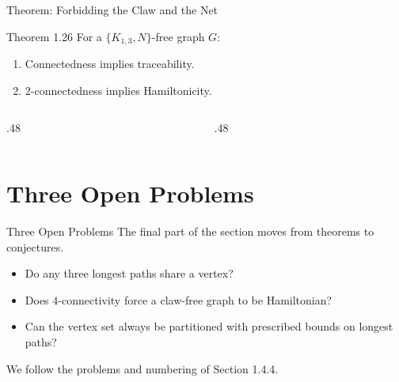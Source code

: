 \documentclass[aspectratio=169,11pt]{beamer}
\begin{document}
\begin{frame}{Theorem: Forbidding the Claw and the Net}
\large
\begin{block}{Theorem 1.26}
For a $\{K_{1,3},N\}$-free graph $G$:\begin{enumerate}\item Connectedness implies traceability.\item $2$-connectedness implies Hamiltonicity.\end{enumerate}
\end{block}
\begin{columns}[c,onlytextwidth]\begin{column}{.48\textwidth}\begin{center}\end{center}\end{column}\begin{column}{.48\textwidth}\begin{center}\end{center}\end{column}\end{columns}
\end{frame}

\section{Three Open Problems}
\begin{frame}{Three Open Problems}
\large
The final part of the section moves from theorems to conjectures.\begin{itemize}\setlength{\itemsep}{.22cm}
\item Do any three longest paths share a vertex?
\item Does $4$-connectivity force a claw-free graph to be Hamiltonian?
\item Can the vertex set always be partitioned with prescribed bounds on longest paths?
\end{itemize}\bigskip We follow the problems and numbering of Section 1.4.4.
\end{frame}
\end{document}
